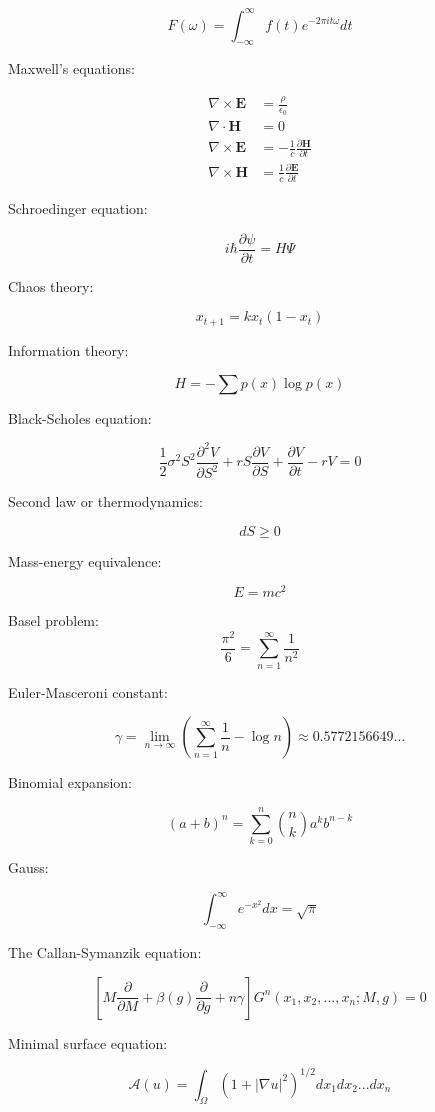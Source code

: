\documentclass{article}
\begin{document}
\[
  F(\omega) = \int_{-\infty}^\infty f(t) e^{-2\pi i t \omega} dt
\]

Maxwell's equations: 

\begin{equation}
\begin{aligned}
\nabla \times \textbf{E}&=\frac{\rho}{\epsilon_0} \\
\nabla \cdot \textbf{H}&=0 \\
\nabla \times \textbf{E}&=-\frac 1c\frac{\partial \textbf{H}}{\partial t} \\
\nabla \times \textbf{H}&=\frac 1c\frac{\partial \textbf{E}}{\partial t}
\end{aligned}
\end{equation}

Schroedinger equation:

\[
i \hbar \frac{\partial \psi}{\partial t} = H\Psi
\]

Chaos theory:

$$x_{t+1}=kx_t(1-x_t)$$

Information theory:

\[
  H=-\sum p(x)\log p(x)
\]

Black-Scholes equation:

$$\frac12\sigma^2S^2\frac{\partial^2V}{\partial S^2}+rS\frac{\partial V}{\partial S}+\frac{\partial V}{\partial t}-rV=0$$

Second law or thermodynamics:

$$dS\ge 0$$

Mass-energy equivalence:

$$E=mc^2$$

Basel problem:
\[
  \frac{\pi^2}{6}=\sum_{n=1}^\infty \frac{1}{n^2}
\]

Euler-Masceroni constant:

\[
\gamma = \lim_{n\to\infty}(\sum_{n=1}^\infty \frac{1}{n}-\log n)\approx 0.5772156649\ldots
\]

Binomial expansion:

\[
(a+b)^n = \sum_{k=0}^n \binom{n}{k} a^k b^{n-k}  
\]

Gauss:

$$\int_{-\infty}^\infty e^{-x^2} dx = \sqrt{\pi}$$

The Callan-Symanzik equation:

\[
\left[M\frac{\partial}{\partial M}+\beta(g)\frac{\partial}{\partial g}+n\gamma\right]G^n(x_1,x_2,...,x_n;M,g)=0
\]

Minimal surface equation:

$$\mathcal{A}(u)=\int_\Omega(1+|\nabla u|^2)^{1/2} dx_1 dx_2 ... dx_n$$ 
\end{document}
